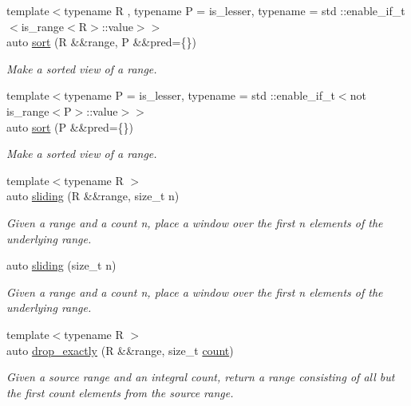 \begin{DoxyCompactItemize}
{\footnotesize template$<$typename R , typename P  = is\+\_\+lesser, typename  = std \+::enable\+\_\+if\+\_\+t$<$is\+\_\+range$<$\+R$>$\+::value$>$$>$ }\\auto \mbox{\hyperlink{namespacerah_1_1view_a343ff36ca2b6470f2a55a89dfb4e3dc9}{sort}} (R \&\&range, P \&\&pred=\{\})
\begin{DoxyCompactList}\small\item\em Make a sorted view of a range. \end{DoxyCompactList}\item 
{\footnotesize template$<$typename P  = is\+\_\+lesser, typename  = std \+::enable\+\_\+if\+\_\+t$<$not is\+\_\+range$<$\+P$>$\+::value$>$$>$ }\\auto \mbox{\hyperlink{namespacerah_1_1view_aee3389bbe781c123aceb0d017a470e11}{sort}} (P \&\&pred=\{\})
\begin{DoxyCompactList}\small\item\em Make a sorted view of a range. \end{DoxyCompactList}\item 
{\footnotesize template$<$typename R $>$ }\\auto \mbox{\hyperlink{namespacerah_1_1view_ad72c07068dabce4709cc2cc4af992ce7}{sliding}} (R \&\&range, size\+\_\+t n)
\begin{DoxyCompactList}\small\item\em Given a range and a count n, place a window over the first n elements of the underlying range. \end{DoxyCompactList}\item 
auto \mbox{\hyperlink{namespacerah_1_1view_a4635f54615d1c4409c9455fd09f9853f}{sliding}} (size\+\_\+t n)
\begin{DoxyCompactList}\small\item\em Given a range and a count n, place a window over the first n elements of the underlying range. \end{DoxyCompactList}\item 
{\footnotesize template$<$typename R $>$ }\\auto \mbox{\hyperlink{namespacerah_1_1view_a85c6a5a689128acf31de380ec19cf6d6}{drop\+\_\+exactly}} (R \&\&range, size\+\_\+t \mbox{\hyperlink{namespacerah_aa528865cc4a45d4eb276329554f16b4b}{count}})
\begin{DoxyCompactList}\small\item\em Given a source range and an integral count, return a range consisting of all but the first count elements from the source range. \end{DoxyCompactList}\item 

\end{DoxyCompactItemize}
